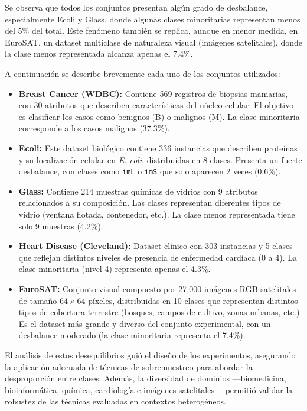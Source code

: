 Se observa que todos los conjuntos presentan algún grado de desbalance, especialmente Ecoli y Glass, donde algunas clases minoritarias representan menos del 5\% del total. Este fenómeno también se replica, aunque en menor medida, en EuroSAT, un dataset multiclase de naturaleza visual (imágenes satelitales), donde la clase menos representada alcanza apenas el 7.4\%.

A continuación se describe brevemente cada uno de los conjuntos utilizados:

\begin{itemize}
    \item \textbf{Breast Cancer (WDBC):} Contiene 569 registros de biopsias mamarias, con 30 atributos que describen características del núcleo celular. El objetivo es clasificar los casos como benignos (B) o malignos (M). La clase minoritaria corresponde a los casos malignos (37.3\%).

    \item \textbf{Ecoli:} Este dataset biológico contiene 336 instancias que describen proteínas y su localización celular en \textit{E. coli}, distribuidas en 8 clases. Presenta un fuerte desbalance, con clases como \texttt{imL} o \texttt{imS} que solo aparecen 2 veces (0.6\%).

    \item \textbf{Glass:} Contiene 214 muestras químicas de vidrios con 9 atributos relacionados a su composición. Las clases representan diferentes tipos de vidrio (ventana flotada, contenedor, etc.). La clase menos representada tiene solo 9 muestras (4.2\%).

    \item \textbf{Heart Disease (Cleveland):} Dataset clínico con 303 instancias y 5 clases que reflejan distintos niveles de presencia de enfermedad cardíaca (0 a 4). La clase minoritaria (nivel 4) representa apenas el 4.3\%.

    \item \textbf{EuroSAT:} Conjunto visual compuesto por 27,000 imágenes RGB satelitales de tamaño $64\times64$ píxeles, distribuidas en 10 clases que representan distintos tipos de cobertura terrestre (bosques, campos de cultivo, zonas urbanas, etc.). Es el dataset más grande y diverso del conjunto experimental, con un desbalance moderado (la clase minoritaria representa el 7.4\%).

\end{itemize}

El análisis de estos desequilibrios guió el diseño de los experimentos, asegurando la aplicación adecuada de técnicas de sobremuestreo para abordar la desproporción entre clases. Además, la diversidad de dominios —biomedicina, bioinformática, química, cardiología e imágenes satelitales— permitió validar la robustez de las técnicas evaluadas en contextos heterogéneos.
